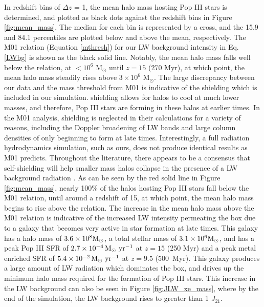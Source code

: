 \documentclass[fleqn,usenatbib]{mnras}
\begin{document}
In redshift bins of $\Delta z$ = 1, the mean halo mass hosting Pop III stars is determined, and plotted as black dots against the redshift bins in Figure \ref{fig:mean_mass}. The median for each bin is represented by a cross, and the 15.9 and 84.1 percentiles are plotted below and above the mean, respectively. The M01 relation (Equation \ref{mthresh}) for our LW background intensity in Eq. \ref{LWbg} is shown as the black solid line. Notably, the mean halo mass falls well below the relation, at $<10^{6}$ M$_{\odot}$ until $z = 15$ (270 Myr), at which point, the mean halo mass steadily rises above $3 \times 10^{6}$ M$_{\odot}$. The large discrepancy between our data and the mass threshold from M01 is indicative of the \hh{} shielding which is included in our simulation. \hh{} shielding allows for halos to cool at much lower masses, and therefore, Pop III stars are forming in these halos at earlier times. In the M01 analysis, \hh{} shielding is neglected in their calculations for a variety of reasons, including the Doppler broadening of LW bands and large column densities of \hh{} only beginning to form at late times. Interestingly, a full radiation hydrodynamics simulation, such as ours, does not produce identical results as M01 predicts. Throughout the literature, there appears to be a consensus that \hh{} self-shielding will help smaller mass halos collapse in the presence of a LW background radiation \citep[e.g.][]{Yoshida03, Ricotti01, Glover01, Hartwig15}. As can be seen by the red solid line in Figure \ref{fig:mean_mass}, nearly 100\% of the halos hosting Pop III stars fall below the M01 relation, until around a redshift of 15, at which point, the mean halo mass begins to rise above the relation. The increase in the mean halo mass above the M01 relation is indicative of the increased LW intensity permeating the box due to a galaxy that becomes very active in star formation at late times. This galaxy has a halo mass of $3.6 \times 10^{8} \rm M_{\odot}$, a total stellar mass of $3.1 \times 10^{6} \rm M_{\odot}$, and has a peak Pop III SFR of $2.7 \times 10^{-4}\, \rm M_{\odot}\ yr^{-1}$ at $z=15$ (250 Myr) and a peak metal enriched SFR of $5.4 \times 10^{-2}\, \rm M_{\odot} \ yr^{-1}$ at $z=9.5$ (500~Myr). This galaxy produces a large amount of LW radiation which dominates the box, and drives up the minimum halo mass required for the formation of Pop III stars. This increase in the LW background can also be seen in Figure \ref{fig:JLW_xe_mass}, where by the end of the simulation, the LW background rises to greater than 1 $J_{21}$.
\end{document}
